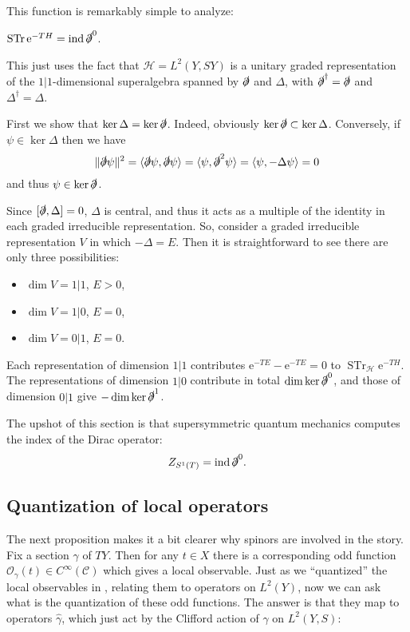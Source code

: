 \documentclass[12pt,letterpaper,reqno]{article}
\numberwithin{equation}{section}
\newcommand{\cC}{\ensuremath{\mathcal C}}
\newcommand{\cO}{\ensuremath{\mathcal O}}
\newcommand{\cH}{\ensuremath{\mathcal H}}
\newcommand{\dirac}{\slashed{\partial}}
\newcommand{\e}{{\mathrm e}}
\newcommand{\norm}[1]{\lVert#1\rVert}
\newcommand{\IP}[1]{\langle#1\rangle}
\DeclareMathOperator{\STr}{STr}
\DeclareMathOperator{\ind}{ind}
\newcommand{\fixme}[1]{{\color{orange}{[#1]}}}
\begin{document}
This function is remarkably simple to analyze:
\begin{prop}
$\STr \e^{-T H} = \ind \dirac^0$.
\end{prop}
\begin{pf}
This just uses the fact that
$\cH = L^2(Y,SY)$ is a unitary graded representation of
the $1|1$-dimensional superalgebra spanned by $\dirac$ and $\Delta$, with $\dirac^\dagger = \dirac$
and $\Delta^\dagger = \Delta$.

First we show that $\ker \Delta = \ker \dirac$.
Indeed, obviously $\ker \dirac \subset \ker \Delta$. Conversely, 
if $\psi \in \ker \Delta$ then we have
\begin{equation}
  \norm{\dirac \psi}^2 = \IP{\dirac \psi, \dirac \psi} = \IP{\psi, \dirac^2 \psi} = \IP{\psi, -\Delta \psi} = 0
\end{equation}
and thus $\psi \in \ker \dirac$.

Since $[\dirac, \Delta] = 0$, $\Delta$ is central, and thus
it acts as a multiple of the identity in each graded irreducible
representation. So, consider a graded irreducible representation
$V$ in which $-\Delta = E$.
Then it is straightforward to see there are only three
possibilities:
\begin{itemize}
  \item $\dim V = 1 \vert 1$, $E > 0$,
  \item $\dim V = 1 \vert 0$, $E = 0$,
  \item $\dim V = 0 \vert 1$, $E = 0$.
\end{itemize}
Each representation of dimension $1 \vert 1$ contributes
$\e^{-TE} - \e^{-TE} = 0$ to $\STr_\cH \e^{-TH}$.
The representations of dimension $1 \vert 0$ contribute
in total $\dim \ker \dirac^0$, and those of dimension $0 \vert 1$
give $- \dim \ker \dirac^1$.
\end{pf}

The upshot of this section is that supersymmetric quantum mechanics
computes the index of the Dirac operator:
\begin{equation} \label{eq:ZS1-index}
  Z_{S^1(T)} = \ind \dirac^0.
\end{equation}


\subsection{Quantization of local operators}

The next proposition makes it a bit clearer why spinors are
involved in the story. Fix a section $\gamma$ of $TY$. Then
for any $t \in X$ there is a corresponding odd 
function $\cO_\gamma(t) \in C^\infty(\cC)$
which gives a local observable. Just as we ``quantized''
the local observables in \fixme{...}, relating them to
operators on $L^2(Y)$, now we can ask what is the
quantization of these odd functions.
The answer is that they map to operators 
$\hat\gamma$, which just act by the 
Clifford action of $\gamma$ on $L^2(Y, S)$:
\end{document}
